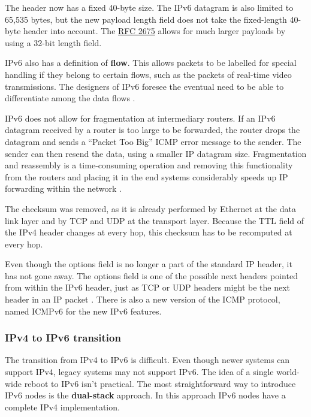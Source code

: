 \documentclass[12pt, oneside]{book}
\begin{document}
The header now has a fixed 40-byte size.
The IPv6 datagram is also limited to 65,535 bytes, but the new payload length field does not take the fixed-length 40-byte header into account.
The \href{https://tools.ietf.org/html/rfc2675}{RFC 2675} allows for much larger payloads by using a 32-bit length field.

IPv6 also has a definition of \textbf{flow}. This allows packets to be labelled for special handling if they belong to certain flows, such as the packets of real-time video transmissions.
The designers of IPv6 foresee the eventual need to be able to differentiate among the data flows \cite{computer-networking-kurose-2012}.

IPv6 does not allow for fragmentation at intermediary routers.
If an IPv6 datagram received by a router is too large to be forwarded, the router drops the datagram and sends a ``Packet Too Big'' ICMP error message to the sender.
The sender can then resend the data, using a smaller IP datagram size.
Fragmentation and reassembly is a time-consuming operation and removing this functionality from the routers and placing it in the end systems considerably speeds up IP forwarding within the network \cite[p.~358]{computer-networking-kurose-2012}.

The checksum was removed, as it is already performed by Ethernet at the data link layer and by TCP and UDP at the transport layer.
Because the TTL field of the IPv4 header changes at every hop, this checksum has to be recomputed at every hop.

Even though the options field is no longer a part of the standard IP header, it has not gone away.
The options field is one of the possible next headers pointed from within the IPv6 header, just as TCP or UDP headers might be the next header in an IP packet \cite[p.~359]{computer-networking-kurose-2012}.
There is also a new version of the ICMP protocol, named ICMPv6 for the new IPv6 features.

\subsubsection{IPv4 to IPv6 transition}

The transition from IPv4 to IPv6 is difficult. Even though newer systems can support IPv4, legacy systems may not support IPv6. The idea of a single world-wide reboot to IPv6 isn't practical. The most straightforward way to introduce IPv6 nodes is the \textbf{dual-stack} approach. In this approach IPv6 nodes have a complete IPv4 implementation.
\end{document}
